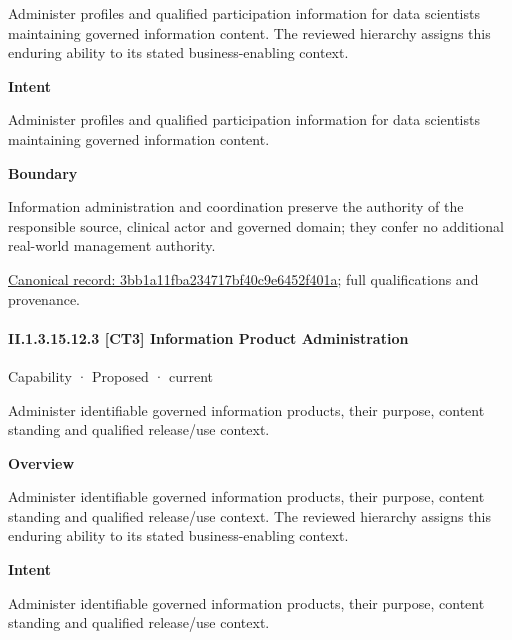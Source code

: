 Administer profiles and qualified participation information for data scientists maintaining governed information content. The reviewed hierarchy assigns this enduring ability to its stated business-enabling context.



\textbf{Intent}



Administer profiles and qualified participation information for data scientists maintaining governed information content.



\textbf{Boundary}



Information administration and coordination preserve the authority of the responsible source, clinical actor and governed domain; they confer no additional real-world management authority.


{\footnotesize \href{../../../../continuum/strategy/capability/3bb1a11fba234717bf40c9e6452f401a.md}{Canonical record: 3bb1a11fba234717bf40c9e6452f401a}; full qualifications and provenance.}\par
\paragraph*{II.1.3.15.12.3 [CT3] Information Product Administration}
\label{navigation:II.1.3.15.12.3}

\label{element:b5a6a31855834ea58870ebb6c51ed4b0}
{\small Capability · Proposed · current}\par

Administer identifiable governed information products, their purpose, content standing and qualified release/use context.



\textbf{Overview}



Administer identifiable governed information products, their purpose, content standing and qualified release/use context. The reviewed hierarchy assigns this enduring ability to its stated business-enabling context.



\textbf{Intent}



Administer identifiable governed information products, their purpose, content standing and qualified release/use context.



